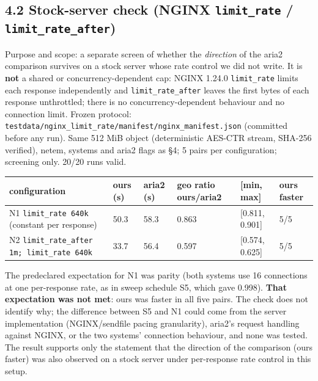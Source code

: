 \documentclass[conference]{IEEEtran}
\begin{document}
\subsection*{4.2 Stock-server check (NGINX \texttt{limit\_\allowbreak{}rate} / \texttt{limit\_\allowbreak{}rate\_\allowbreak{}after})}

Purpose and scope: a separate screen of whether the \emph{direction} of the aria2 comparison survives on a stock server whose rate control we did not write. It is \textbf{not} a shared or concurrency-dependent cap: NGINX 1.24.0 \texttt{limit\_\allowbreak{}rate} limits each response independently and \texttt{limit\_\allowbreak{}rate\_\allowbreak{}after} leaves the first bytes of each response unthrottled; there is no concurrency-dependent behaviour and no connection limit. Frozen protocol: \texttt{testdata/\allowbreak{}nginx\_limit\_rate/\allowbreak{}manifest/\allowbreak{}nginx\_manifest.json} (committed before any run). Same 512 MiB object (deterministic AES-CTR stream, SHA-256 verified), netem, systems and aria2 flags as §4; 5 pairs per configuration; screening only. 20/20 runs valid.


\begin{table}[!t]\centering\scriptsize
\begin{tabularx}{\textwidth}{@{}LLLLLL@{}}
\toprule
\textbf{configuration} & \textbf{ours (s)} & \textbf{aria2 (s)} & \textbf{geo ratio ours/aria2} & \textbf{[min, max]} & \textbf{ours faster}\\
\midrule
N1 \texttt{limit\_\allowbreak{}rate 640k} (constant per response) & 50.3 & 58.3 & 0.863 & [0.811, 0.901] & 5/5\\
N2 \texttt{limit\_\allowbreak{}rate\_\allowbreak{}after 1m; limit\_\allowbreak{}rate 640k} & 33.7 & 56.4 & 0.597 & [0.574, 0.625] & 5/5\\
\bottomrule
\end{tabularx}
\end{table}


The predeclared expectation for N1 was parity (both systems use 16 connections at one per-response rate, as in sweep schedule S5, which gave 0.998). \textbf{That expectation was not met}: ours was faster in all five pairs. The check does not identify why; the difference between S5 and N1 could come from the server implementation (NGINX/sendfile pacing granularity), aria2's request handling against NGINX, or the two systems' connection behaviour, and none was tested. The result supports only the statement that the direction of the comparison (ours faster) was also observed on a stock server under per-response rate control in this setup.
\end{document}
